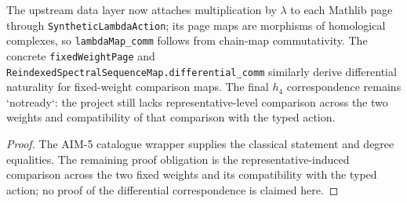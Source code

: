 \begin{proposition}
  \label{prop:aim6-h4-comparison}
  \notready
  The upstream data layer now attaches multiplication by $\lambda$ to each
  Mathlib page through \texttt{SyntheticLambdaAction}; its page maps are
  morphisms of homological complexes, so \texttt{lambdaMap\_comm} follows from
  chain-map commutativity.  The concrete \texttt{fixedWeightPage} and
  \texttt{ReindexedSpectralSequenceMap.differential\_comm} similarly derive
  differential naturality for fixed-weight comparison maps.  The final $h_4$
  correspondence remains `notready`: the project still lacks
  representative-level comparison across the two weights and compatibility
  of that comparison with the typed action.
\end{proposition}

\begin{proof}
  The AIM-5 catalogue wrapper supplies the classical statement and degree
  equalities.  The remaining proof obligation is the representative-induced
  comparison across the two fixed weights and its compatibility with the
  typed action; no proof of the differential correspondence is claimed here.
\end{proof}

